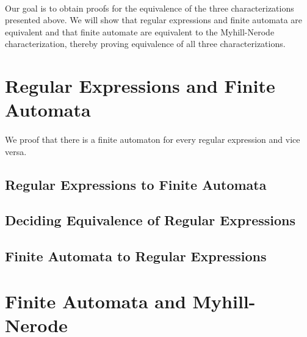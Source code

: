 \documentclass[11pt,a4paper,oneside]{book}
\begin{document}
        \paragraph{} Our goal is to obtain proofs for the equivalence of the three characterizations presented above. We will show that regular expressions and finite automata are equivalent and that finite automate are equivalent to the Myhill-Nerode characterization, thereby proving equivalence of all three characterizations.

        \section{Regular Expressions and Finite Automata}

            \paragraph{} We proof that there is a finite automaton for every regular expression and vice versa.  

            \subsection{Regular Expressions to Finite Automata}

                \paragraph{}

            \subsection{Deciding Equivalence of Regular Expressions}

                \paragraph{}

            \subsection{Finite Automata to Regular Expressions}

                \paragraph{}


        \section{Finite Automata and Myhill-Nerode}
\end{document}
